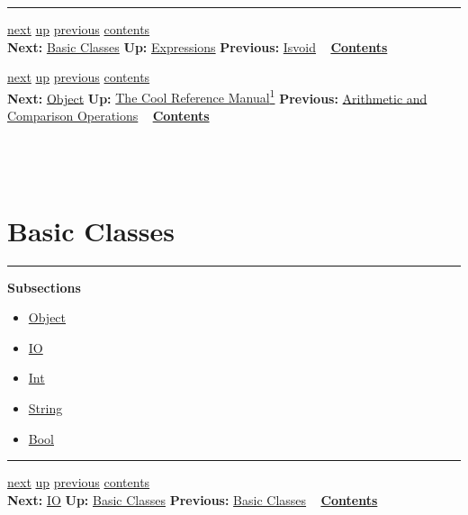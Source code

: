 \documentclass[]{article}
\begin{document}
\begin{center}\rule{3in}{0.4pt}\end{center}

\href{node26.html}{next} \href{node13.html}{up}
\href{node24.html}{previous} \href{node1.html}{contents} \\
\textbf{Next:} \href{node26.html}{Basic Classes} \textbf{Up:}
\href{node13.html}{Expressions} \textbf{Previous:}
\href{node24.html}{Isvoid} ~ \textbf{\href{node1.html}{Contents}}

\href{node27.html}{next} \href{cool-manual.html}{up}
\href{node25.html}{previous} \href{node1.html}{contents} \\
\textbf{Next:} \href{node27.html}{Object} \textbf{Up:}
\href{cool-manual.html}{The Cool Reference Manual\textsuperscript{1}}
\textbf{Previous:} \href{node25.html}{Arithmetic and Comparison
Operations} ~ \textbf{\href{node1.html}{Contents}} \\ \\

\section{\\ Basic Classes}

\begin{center}\rule{3in}{0.4pt}\end{center}

\textbf{Subsections}

\begin{itemize}
\itemsep1pt\parskip0pt
\item
  \href{node27.html}{Object}
\item
  \href{node28.html}{IO}
\item
  \href{node29.html}{Int}
\item
  \href{node30.html}{String}
\item
  \href{node31.html}{Bool}
\end{itemize}

\begin{center}\rule{3in}{0.4pt}\end{center}

\href{node28.html}{next} \href{node26.html}{up}
\href{node26.html}{previous} \href{node1.html}{contents} \\
\textbf{Next:} \href{node28.html}{IO} \textbf{Up:}
\href{node26.html}{Basic Classes} \textbf{Previous:}
\href{node26.html}{Basic Classes} ~ \textbf{\href{node1.html}{Contents}}
\\ \\
\end{document}
